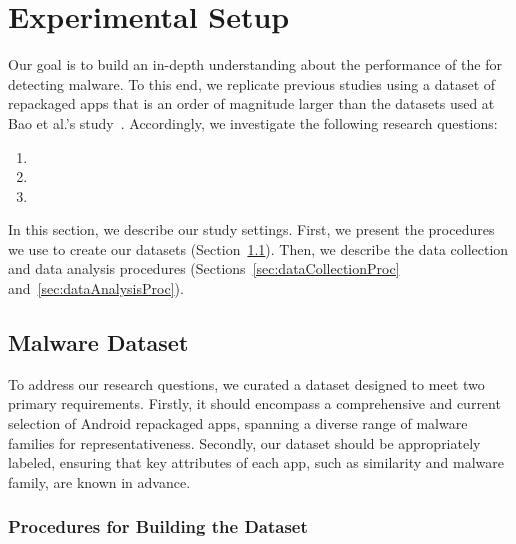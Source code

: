 \section{Experimental Setup}\label{sec:experimentalSetup}

Our goal is to build an in-depth understanding about
the performance of the \mas for detecting malware. To this
end, we replicate previous studies using a dataset of repackaged apps that is an order of magnitude
larger than the datasets used at Bao et al.’s study~\cite{DBLP:conf/wcre/BaoLL18}. Accordingly,
we investigate the following research questions:

\begin{enumerate}[(RQ1)]
\item \rqa
\item \rqc
\item \rqd
\end{enumerate}

In this section, we describe our study settings. First, we present the procedures we use to create our datasets (Section~\ref{sec:dataset}).  Then, we describe the data collection and data analysis procedures (Sections~\ref{sec:dataCollectionProc} and~\ref{sec:dataAnalysisProc}).


\subsection{Malware Dataset}\label{sec:dataset}


To address our research questions, we curated a dataset designed to meet two primary requirements.
Firstly, it should encompass a comprehensive and current selection of Android repackaged apps, spanning a diverse range of malware families for representativeness.
Secondly, our dataset should be appropriately labeled, ensuring that key attributes of each app, such as similarity and malware family, are known in advance.

\subsubsection{Procedures for Building the Dataset}

